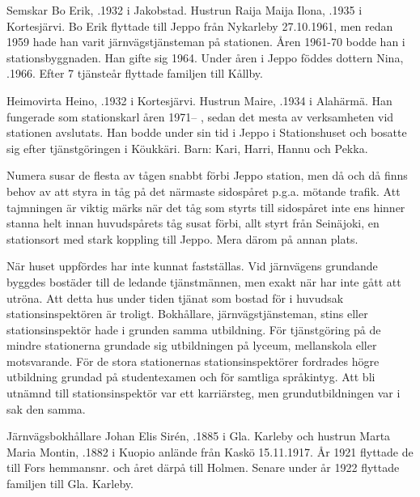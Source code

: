{ Semskar Bo Erik, .1932 i Jakobstad. Hustrun Raija Maija Ilona, .1935 i Kortesjärvi. Bo Erik flyttade till Jeppo från Nykarleby 27.10.1961, men redan 1959 hade han varit järnvägstjänsteman på stationen. Åren 1961-70 bodde han i stationsbyggnaden. Han gifte sig 1964. Under åren i Jeppo föddes dottern Nina, .1966. Efter 7 tjänsteår flyttade familjen till Kållby.

 Heimovirta Heino, .1932 i Kortesjärvi. Hustrun Maire, .1934 i Alahärmä. Han fungerade som stationskarl åren 1971-- , sedan det mesta av verksamheten vid stationen avslutats. Han bodde under sin tid i Jeppo i Stationshuset och bosatte sig efter tjänstgöringen i Köukkäri.
Barn: Kari, Harri, Hannu och Pekka.

Numera susar de flesta av tågen snabbt förbi Jeppo station, men då och då finns behov av att styra in tåg på det närmaste sidospåret p.g.a. mötande trafik. Att tajmningen är viktig märks när det tåg som styrts till sidospåret inte ens hinner stanna helt innan huvudspårets tåg susat förbi, allt styrt från Seinäjoki, en stationsort med stark koppling till Jeppo. Mera därom på annan plats.



\jhnooccupant{}

När huset uppfördes har inte kunnat fastställas. Vid järnvägens grundande byggdes bostäder till de ledande tjänstmännen, men exakt när har inte gått att utröna. Att detta hus under tiden tjänat som bostad för i huvudsak stationsinspektören är troligt. Bokhållare, järnvägstjänsteman, stins eller stationsinspektör hade i grunden samma utbildning. För tjänstgöring på de mindre stationerna grundade sig utbildningen på lyceum, mellanskola eller motsvarande. För de stora stationernas stationsinspektörer fordrades högre utbildning grundad på studentexamen och för samtliga språkintyg. Att bli utnämnd till stationsinspektör var ett karriärsteg, men grundutbildningen var i sak den samma.


Järnvägsbokhållare Johan Elis Sirén, .1885 i Gla. Karleby och hustrun Marta Maria Montin, .1882 i Kuopio anlände från Kaskö 15.11.1917. År 1921 flyttade de till Fors hemmansnr. och året därpå till Holmen. Senare under år 1922 flyttade familjen till Gla. Karleby.
\begin{jhchildren}
  \item {}
  \item {}
\end{jhchildren}


}
